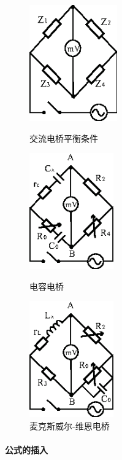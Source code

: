 \documentclass[12pt,a4paper,UTF8]{ctexart}
\begin{document}
	\begin{figure}[htbp]
	\centering
	\begin{minipage}{0.3\textwidth}
	\centering
			\includegraphics[height=5cm]{img//1.eps}
			\caption{交流电桥平衡条件}
	\end{minipage}
	\hfill
	\begin{minipage}{0.3\textwidth}
	\centering
			\includegraphics[height=5cm]{img//2.eps}
			\caption{电容电桥}
	\end{minipage}
	\hfill
	\begin{minipage}{0.3\textwidth}
	\centering
			\includegraphics[height=5cm]{img//3.eps}
			\caption{麦克斯威尔-维恩电桥}
	\end{minipage}
	\end{figure}

\newpage
\paragraph*{公式的插入}
\end{document}
